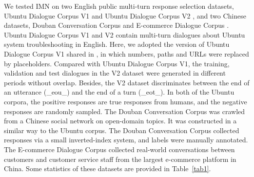 \documentclass[sigconf]{acmart}
\begin{document}
    We tested IMN on two English public multi-turn response selection datasets, Ubuntu Dialogue Corpus V1 \cite{DBLP:conf/sigdial/LowePSP15} and Ubuntu Dialogue Corpus V2 \cite{DBLP:journals/dad/LowePSCLP17}, and two Chinese datasets, Douban Conversation Corpus \cite{DBLP:conf/acl/WuWXZL17} and E-commerce Dialogue Corpus \cite{DBLP:conf/coling/ZhangLZZL18}.
    Ubuntu Dialogue Corpus V1 and V2 contain multi-turn dialogues about Ubuntu system troubleshooting in English.
    Here, we adopted the version of Ubuntu Dialogue Corpus V1 shared in \citet{DBLP:journals/corr/XuLWSW16}, in which numbers, paths and URLs were replaced by placeholders.
    Compared with Ubuntu Dialogue Corpus V1, the training, validation and test dialogues in the V2 dataset were generated in different periods without overlap. Besides, the V2 dataset discriminates between the end of an utterance (\_eou\_) and the end of a turn (\_eot\_). In both of the Ubuntu corpora, the positive responses are true responses from humans, and the negative responses are randomly sampled.
    The Douban Conversation Corpus was crawled from a Chinese social network on open-domain topics. It was constructed in a similar way to the Ubuntu corpus. The Douban Conversation Corpus collected responses via a small inverted-index system, and labels were manually annotated. The E-commerce Dialogue Corpus collected real-world conversations between customers and customer service staff from the largest e-commerce platform in China.
    Some statistics of these datasets are provided in Table~\ref{tab1}.
\end{document}
